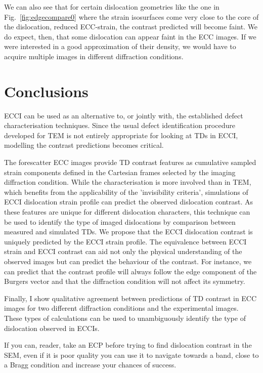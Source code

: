 We can also see that for certain dislocation geometries like the one in Fig.~\ref{fig:edgecompare0} where the strain isosurfaces come very close to the core of the dislocation, \ie reduced ECC-strain, the contrast predicted will become faint. We do expect, then, that some dislocation can appear faint in the ECC images. If we were interested in a good approximation of their density, we would have to acquire multiple images in different diffraction conditions. 

\clearpage



\section{Conclusions}
ECCI can be used as an alternative to, or jointly with, the established defect characterisation techniques. Since the usual defect identification procedure developed for TEM is not entirely appropriate for looking at TDs in ECCI, modelling the contrast predictions becomes critical. 

The forescatter ECC images provide TD contrast features as cumulative sampled strain components defined in the Cartesian frames selected by the imaging diffraction condition. While the characterisation is more involved than in TEM, which benefits from the applicability of the 'invisibility criteria', simulations of ECCI dislocation strain profile can predict the observed dislocation contrast. As these features are unique for different dislocation characters, this technique can be used to identify the type of imaged dislocations by comparison between measured and simulated TDs. We propose that the ECCI dislocation contrast is uniquely predicted by the ECCI strain profile. The equivalence between ECCI strain and ECCI contrast can aid not only the physical understanding of the observed images but can predict the behaviour of the contrast. For instance, we can predict that the contrast profile will always follow the edge component of the Burgers vector and that the diffraction condition will not affect its symmetry.


Finally, I show qualitative agreement between predictions of TD contrast in ECC images for two different diffraction conditions and the experimental images. These types of calculations can be used to  unambiguously identify  the type of dislocation observed in ECCIs. 


If you can, reader, take an ECP before trying to find dislocation contrast in the SEM, even if it is poor quality you can use it to navigate towards a band, close to a Bragg condition and increase your chances of success. 



      
